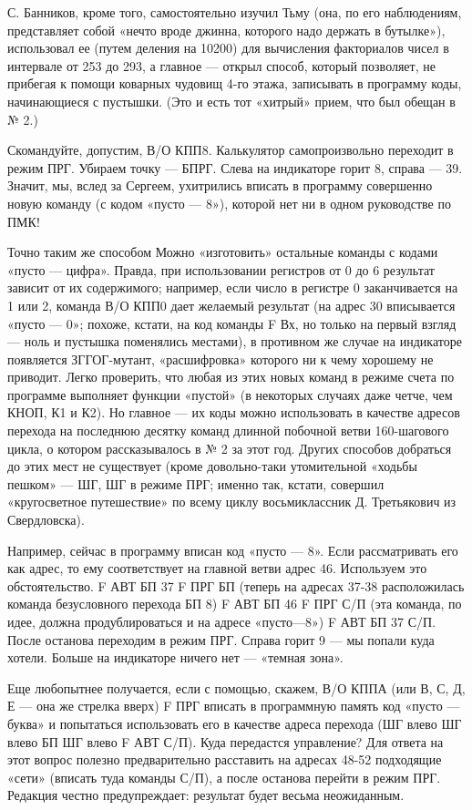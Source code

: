 \documentclass[11pt,a4paper,oneside]{article}
\begin{document}
С.	Банников, кроме того, самостоятельно изучил Тьму (она, по его наблюдениям, представляет собой «нечто вроде джинна, которого надо держать в бутылке»), использовал ее (путем деления на 10200) для вычисления факториалов чисел в интервале от 253 до 293, а главное — открыл способ, который позволяет, не прибегая к помощи коварных чудовищ 4-го этажа, записывать в программу коды, начинающиеся с пустышки. (Это и есть тот «хитрый» прием, что был обещан в № 2.)

Скомандуйте, допустим, В/О КПП8. Калькулятор самопроизвольно переходит в режим ПРГ. Убираем точку — БПРГ. Слева на индикаторе горит 8, справа — 39. Значит, мы, вслед за Сергеем, ухитрились вписать в программу совершенно новую команду (с кодом «пусто — 8»), которой нет ни в одном руководстве по ПМК!

Точно таким же способом Можно «изготовить» остальные команды с кодами «пусто — цифра». Правда, при использовании регистров от 0 до 6 результат зависит от их содержимого; например, если число в регистре 0 заканчивается на 1 или 2, команда В/О КПП0 дает желаемый результат (на адрес 30 вписывается «пусто — 0»; похоже, кстати, на код команды F Вх, но только на первый взгляд — ноль и пустышка поменялись местами), в противном же случае на индикаторе появляется ЗГГОГ-мутант, «расшифровка» которого ни к чему хорошему не приводит. Легко проверить, что любая из этих новых команд в режиме счета по программе выполняет функции «пустой» (в некоторых случаях даже четче, чем КНОП, К1 и К2). Но главное — их коды можно использовать в качестве адресов перехода на последнюю десятку команд длинной побочной ветви 160-шагового цикла, о котором рассказывалось в № 2 за этот год. Других способов добраться до этих мест не существует (кроме довольно-таки утомительной «ходьбы пешком» — ШГ, ШГ в режиме ПРГ; именно так, кстати, совершил «кругосветное путешествие» по всему циклу восьмиклассник Д. Третьякович из Свердловска).

Например, сейчас в программу вписан код «пусто — 8». Если рассматривать его как адрес, то ему соответствует на главной ветви адрес 46. Используем это обстоятельство. F АВТ БП 37 F ПРГ БП (теперь на адресах 37-38 расположилась команда безусловного перехода БП 8) F АВТ БП 46 F ПРГ С/П (эта команда, по идее, должна продублироваться и на адресе «пусто—8») F АВТ БП 37 С/П. После останова переходим в режим ПРГ. Справа горит 9 — мы попали куда хотели. Больше на индикаторе ничего нет — «темная зона».

Еще любопытнее получается, если с помощью, скажем, В/О КППА (или В, С, Д, Е — она же стрелка вверх) F ПРГ вписать в программную память код «пусто — буква» и попытаться использовать его в качестве адреса перехода (ШГ влево ШГ влево БП ШГ влево F АВТ С/П). Куда передастся управление? Для ответа на этот вопрос полезно предварительно расставить на адресах 48-52 подходящие «сети» (вписать туда команды С/П), а после останова перейти в режим ПРГ. Редакция честно предупреждает: результат будет весьма неожиданным.
\end{document}

